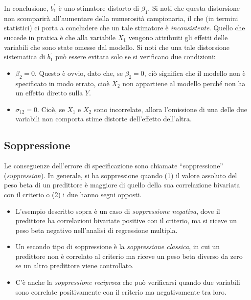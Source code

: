 \documentclass[
  11pt,
]{krantz}
\providecommand{\tightlist}{%
  \setlength{\itemsep}{0pt}\setlength{\parskip}{0pt}}
\begin{document}
In conclusione, \(b_1^\prime\) è uno stimatore distorto di \(\beta_1\). Si noti che questa distorsione non scomparirà all'aumentare della numerosità campionaria, il che (in termini statistici) ci porta a concludere che un tale stimatore è \emph{inconsistente}. Quello che succede in pratica è che alla variabile \(X_1\) vengono attribuiti gli effetti delle variabili che sono state omesse dal modello. Si noti che una tale distorsione sistematica di \(b_1^\prime\) può essere evitata solo se si verificano due condizioni:

\begin{itemize}
\tightlist
\item
  \(\beta_2 = 0\). Questo è ovvio, dato che, se \(\beta_2 = 0\), ciò significa che il modello non è specificato in modo errato, cioè \(X_2\) non appartiene al modello perché non ha un effetto diretto sulla \(Y\).
\item
  \(\sigma_{12} = 0\). Cioè, se \(X_1\) e \(X_2\) sono incorrelate, allora l'omissione di una delle due variabili non comporta stime distorte dell'effetto dell'altra.
\end{itemize}

\hypertarget{soppressione}{%
\subsection{Soppressione}\label{soppressione}}

Le conseguenze dell'errore di specificazione sono chiamate ``soppressione'' (\emph{suppression}). In generale, si ha soppressione quando (1) il valore assoluto del peso beta di un predittore è maggiore di quello della sua correlazione bivariata con il criterio o (2) i due hanno segni opposti.

\begin{itemize}
\tightlist
\item
  L'esempio descritto sopra è un caso di \emph{soppressione negativa}, dove il predittore ha correlazioni bivariate positive con il criterio, ma si riceve un peso beta negativo nell'analisi di regressione multipla.
\item
  Un secondo tipo di soppressione è la \emph{soppressione classica}, in cui un predittore non è correlato al criterio ma riceve un peso beta diverso da zero se un altro predittore viene controllato.
\item
  C'è anche la \emph{soppressione reciproca} che può verificarsi quando due variabili sono correlate positivamente con il criterio ma negativamente tra loro.
\end{itemize}
\end{document}
